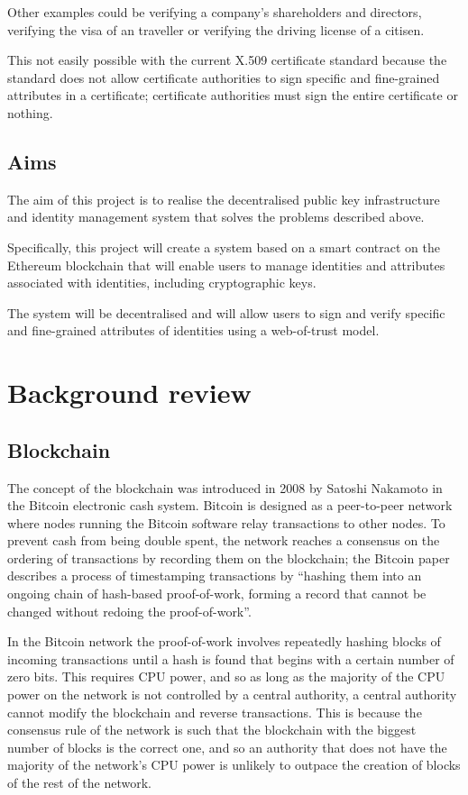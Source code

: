\documentclass[12pt]{report}
\begin{document}
	Other examples could be verifying a company's shareholders and directors, verifying the visa of an traveller or verifying the driving license of a citisen.
	
	This not easily possible with the current X.509 certificate standard because the standard does not allow certificate authorities to sign specific and fine-grained attributes in a certificate; certificate authorities must sign the entire certificate or nothing.
	
	
	\section{Aims}
	The aim of this project is to realise the decentralised public key infrastructure and identity management system that solves the problems described above.
	
	Specifically, this project will create a system based on a smart contract on the Ethereum blockchain that will enable users to manage identities and attributes associated with identities, including cryptographic keys.
	
	The system will be decentralised and will allow users to sign and verify specific and fine-grained attributes of identities using a web-of-trust model.
	
	\chapter{Background review}
	\section{Blockchain}
	The	concept of the blockchain was introduced in 2008 by Satoshi Nakamoto in the Bitcoin electronic cash system.\cite{9} Bitcoin is designed as a peer-to-peer network where nodes running the Bitcoin software relay transactions to other nodes. To prevent cash from being double spent, the network reaches a consensus on the ordering of transactions by recording them on the blockchain; the Bitcoin paper describes a process of timestamping transactions by ``hashing them into an ongoing chain of hash-based proof-of-work, forming a record that cannot be changed without redoing the proof-of-work''.
	
	In the Bitcoin network the proof-of-work involves repeatedly hashing blocks of incoming transactions until a hash is found that begins with a certain number of zero bits. This requires CPU power, and so as long as the majority of the CPU power on the network is not controlled by a central authority, a central authority cannot modify the blockchain and reverse transactions. This is because the consensus rule of the network is such that the blockchain with the biggest number of blocks is the correct one, and so an authority that does not have the majority of the network's CPU power is unlikely to outpace the creation of blocks of the rest of the network.
	
\end{document}
